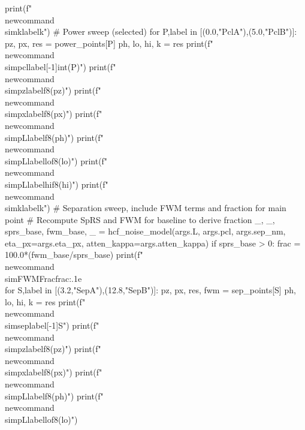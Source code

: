 {{        print(f"\\newcommand{{\\simk{label}}}{{{k}}}")
    # Power sweep (selected)
    for P,label in [(0.0,"PclA"),(5.0,"PclB")]:
        pz, px, res = power_points[P]
        ph, lo, hi, k = res
        print(f"\\newcommand{{\\simpcl{label[-1]}}}{{{int(P)}}}")
        print(f"\\newcommand{{\\simpz{label}}}{{{f8(pz)}}}")
        print(f"\\newcommand{{\\simpx{label}}}{{{f8(px)}}}")
        print(f"\\newcommand{{\\simpL{label}}}{{{f8(ph)}}}")
        print(f"\\newcommand{{\\simpL{label}lo}}{{{f8(lo)}}}")
        print(f"\\newcommand{{\\simpL{label}hi}}{{{f8(hi)}}}")
        print(f"\\newcommand{{\\simk{label}}}{{{k}}}")
    # Separation sweep, include FWM terms and fraction for main point
    # Recompute SpRS and FWM for baseline to derive fraction
    _, _, sprs_base, fwm_base, _ = hcf_noise_model(args.L, args.pcl, args.sep_nm,
                                                   eta_px=args.eta_px, atten_kappa=args.atten_kappa)
    if sprs_base > 0:
        frac = 100.0*(fwm_base/sprs_base)
        print(f"\\newcommand{{\\simFWMFrac}}{{{frac:.1e}\\%
    for S,label in [(3.2,"SepA"),(12.8,"SepB")]:
        pz, px, res, fwm = sep_points[S]
        ph, lo, hi, k = res
        print(f"\\newcommand{{\\simsep{label[-1]}}}{{{S}}}")
        print(f"\\newcommand{{\\simpz{label}}}{{{f8(pz)}}}")
        print(f"\\newcommand{{\\simpx{label}}}{{{f8(px)}}}")
        print(f"\\newcommand{{\\simpL{label}}}{{{f8(ph)}}}")
        print(f"\\newcommand{{\\simpL{label}lo}}{{{f8(lo)}}}")
}}}}
